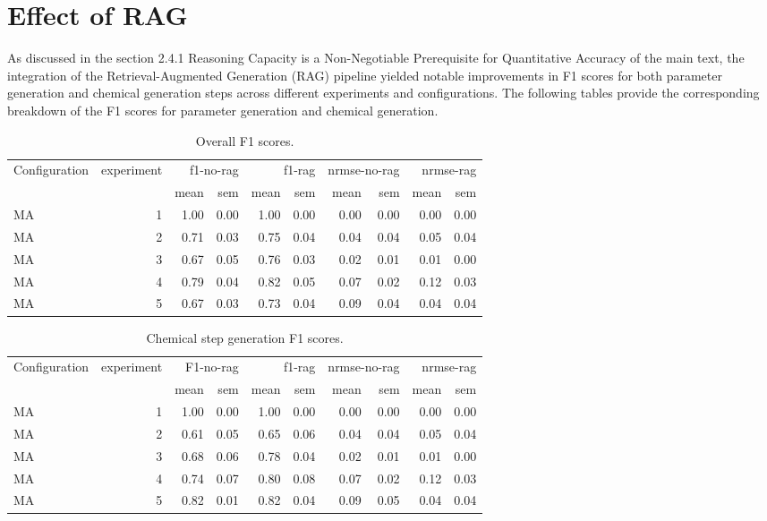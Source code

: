 \documentclass[sn-nature, twocolumn]{sn-jnl}%
\theoremstyle{thmstyleone}%
\theoremstyle{thmstyletwo}%
\theoremstyle{thmstylethree}%
\begin{document}
\clearpage
\section{Effect of RAG}
As discussed in the section 2.4.1 Reasoning Capacity is a Non-Negotiable Prerequisite for Quantitative Accuracy of the main text, the integration of the Retrieval-Augmented Generation (RAG) pipeline yielded notable improvements in F1 scores for both parameter generation and chemical generation steps across different experiments and configurations.
The following tables provide the corresponding breakdown of the F1 scores for parameter generation and chemical generation.


\begin{table}[!htb]

\begin{tabular}{lrrrrrrrrr}
\toprule
Configuration & experiment & \multicolumn{2}{r}{f1-no-rag} & \multicolumn{2}{r}{f1-rag} & \multicolumn{2}{r}{nrmse-no-rag} & \multicolumn{2}{r}{nrmse-rag} \\
 &  & mean & sem & mean & sem & mean & sem & mean & sem \\
\midrule
MA & 1 & 1.00 & 0.00 & 1.00 & 0.00 & 0.00 & 0.00 & 0.00 & 0.00 \\
MA & 2 & 0.71 & 0.03 & 0.75 & 0.04 & 0.04 & 0.04 & 0.05 & 0.04 \\
MA & 3 & 0.67 & 0.05 & 0.76 & 0.03 & 0.02 & 0.01 & 0.01 & 0.00 \\
MA & 4 & 0.79 & 0.04 & 0.82 & 0.05 & 0.07 & 0.02 & 0.12 & 0.03 \\
MA & 5 & 0.67 & 0.03 & 0.73 & 0.04 & 0.09 & 0.04 & 0.04 & 0.04 \\
\bottomrule
\end{tabular}
    \caption{Overall F1 scores.}
    \label{tab:placeholder}
\end{table}



\begin{table}[!htb]

\begin{tabular}{lrrrrrrrrr}
\toprule
Configuration & experiment & \multicolumn{2}{r}{F1-no-rag} & \multicolumn{2}{r}{f1-rag} & \multicolumn{2}{r}{nrmse-no-rag} & \multicolumn{2}{r}{nrmse-rag} \\
 &  & mean & sem & mean & sem & mean & sem & mean & sem \\
\midrule
MA & 1 & 1.00 & 0.00 & 1.00 & 0.00 & 0.00 & 0.00 & 0.00 & 0.00 \\
MA & 2 & 0.61 & 0.05 & 0.65 & 0.06 & 0.04 & 0.04 & 0.05 & 0.04 \\
MA & 3 & 0.68 & 0.06 & 0.78 & 0.04 & 0.02 & 0.01 & 0.01 & 0.00 \\
MA & 4 & 0.74 & 0.07 & 0.80 & 0.08 & 0.07 & 0.02 & 0.12 & 0.03 \\
MA & 5 & 0.82 & 0.01 & 0.82 & 0.04 & 0.09 & 0.05 & 0.04 & 0.04 \\
\bottomrule
\end{tabular}

    \caption{Chemical step generation F1 scores.}
    \label{tab:placeholder}
\end{table}
\end{document}
